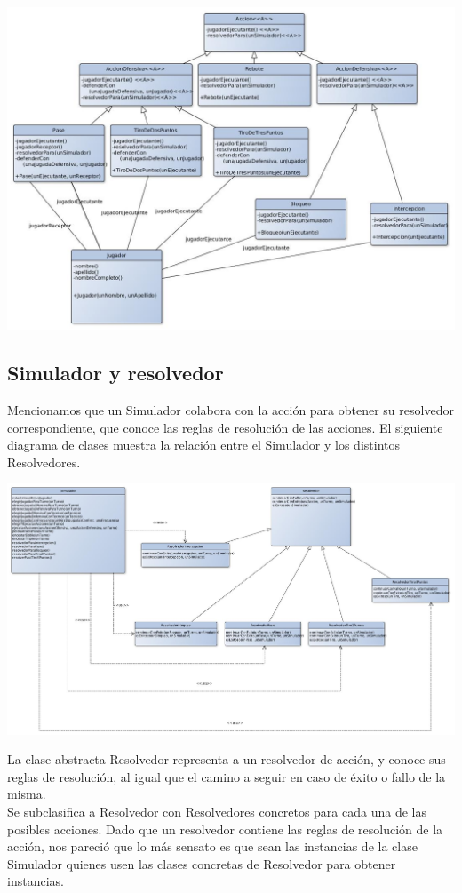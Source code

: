 \begin{center}
\includegraphics[scale=0.35]{diseno/acciones.jpg}
\end{center}

\subsection{Simulador y resolvedor}

Mencionamos que un Simulador colabora con la acción para obtener su resolvedor correspondiente, que conoce las reglas de resolución de las acciones. El siguiente diagrama de clases muestra la relación entre el Simulador y los distintos Resolvedores.


\begin{center}
\includegraphics[scale=0.35, angle=90]{diseno/simuladorYResolvedor.jpg}
\end{center}

La clase abstracta Resolvedor representa a un resolvedor de acción, y conoce sus reglas de resolución, al igual que el camino a seguir en caso de éxito o fallo de la misma.\\
Se subclasifica a Resolvedor con Resolvedores concretos para cada una de las posibles acciones.
Dado que un resolvedor contiene las reglas de resolución de la acción, nos pareció que lo más sensato es que sean las instancias de la clase Simulador quienes usen las clases concretas de Resolvedor para obtener instancias.\\

